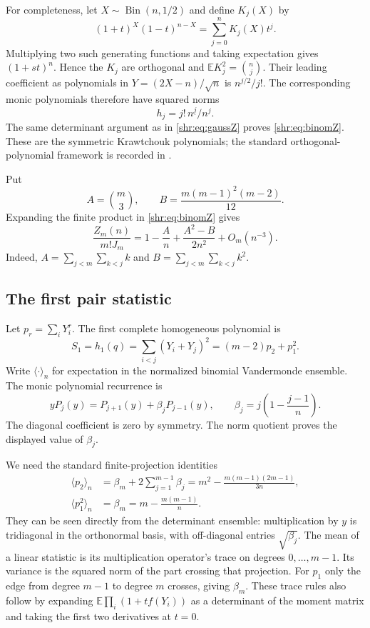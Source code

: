 \documentclass[11pt,letterpaper]{article}
\numberwithin{equation}{section}
\theoremstyle{definition}
\newcommand{\E}{\mathbb E}
\newcommand{\1}{\mathbf 1}
\newcommand{\fall}[2]{#1^{\underline{#2}}}
\begin{document}
For completeness, let $X\sim\operatorname{Bin}(n,1/2)$ and define $K_j(X)$
by
\[
 (1+t)^X(1-t)^{n-X}=\sum_{j=0}^n K_j(X)t^j.
\]
Multiplying two such generating functions and taking expectation gives
$(1+st)^n$. Hence the $K_j$ are orthogonal and
$\E K_j^2=\binom nj$. Their leading coefficient as polynomials in
$Y=(2X-n)/\sqrt n$ is $n^{j/2}/j!$. The corresponding monic polynomials
therefore have squared norms
\[
 h_j=j!\,\fall n j/n^j.
\]
The same determinant argument as in \eqref{shr:eq:gaussZ} proves
\eqref{shr:eq:binomZ}. These are the symmetric Krawtchouk polynomials; the
standard orthogonal-polynomial framework is recorded in \cite{DLMFpoly}.

Put
\begin{equation}
 A=\binom m3,\qquad B=\frac{m(m-1)^2(m-2)}{12}.
\end{equation}
Expanding the finite product in \eqref{shr:eq:binomZ} gives
\begin{equation}
 \frac{Z_m(n)}{m!J_m}=1-\frac A n+\frac{A^2-B}{2n^2}+O_m(n^{-3}).
 \label{shr:eq:Zexpand}
\end{equation}
Indeed, $A=\sum_{j<m}\sum_{k<j}k$ and
$B=\sum_{j<m}\sum_{k<j}k^2$.

\subsection{The first pair statistic}
Let $p_r=\sum_iY_i^r$. The first complete homogeneous polynomial is
\begin{equation}
 S_1=h_1(q)=\sum_{i<j}(Y_i+Y_j)^2=(m-2)p_2+p_1^2.
 \label{shr:eq:S1}
\end{equation}
Write $\langle\cdot\rangle_n$ for expectation in the normalized binomial
Vandermonde ensemble. The monic polynomial recurrence is
\[
 yP_j(y)=P_{j+1}(y)+\beta_jP_{j-1}(y),\qquad
 \beta_j=j\left(1-\frac{j-1}{n}\right).
\]
The diagonal coefficient is zero by symmetry. The norm quotient proves
the displayed value of $\beta_j$.

We need the standard finite-projection identities
\begin{align}
 \langle p_2\rangle_n&=\beta_m+2\sum_{j=1}^{m-1}\beta_j
 =m^2-\frac{m(m-1)(2m-1)}{3n},\\
 \langle p_1^2\rangle_n&=\beta_m
 =m-\frac{m(m-1)}n.
 \label{shr:eq:traceidentities}
\end{align}
They can be seen directly from the determinant ensemble: multiplication
by $y$ is tridiagonal in the orthonormal basis, with off-diagonal entries
$\sqrt{\beta_j}$. The mean of a linear statistic is its multiplication
operator's trace on degrees $0,\ldots,m-1$. Its variance is the squared
norm of the part crossing that projection. For $p_1$ only the edge from
degree $m-1$ to degree $m$ crosses, giving $\beta_m$.
These trace rules also follow by expanding
$\E\prod_i(1+t f(Y_i))$ as a determinant of the moment matrix and taking
the first two derivatives at $t=0$.
\end{document}
